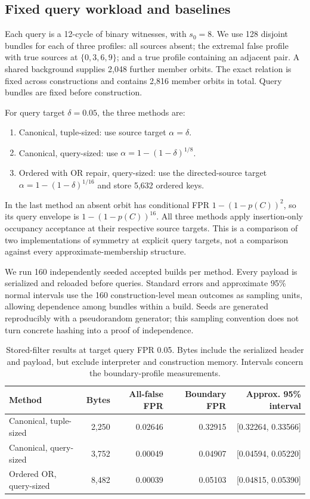 \documentclass[../main.tex]{subfiles}
\begin{document}
\subsection{Fixed query workload and baselines}
Each query is a 12-cycle of binary witnesses, with $s_0=8$. We use 128 disjoint
bundles for each of three profiles: all sources absent; the extremal false
profile with true sources at $\{0,3,6,9\}$; and a true profile containing an
adjacent pair. A shared background supplies 2,048 further member orbits.
The exact relation is fixed across constructions and contains 2,816 member
orbits in total. Query bundles are fixed before construction.

For query target $\delta=0.05$, the three methods are:
\begin{enumerate}
\item Canonical, tuple-sized: use source target $\alpha=\delta$.
\item Canonical, query-sized: use $\alpha=1-(1-\delta)^{1/8}$.
\item Ordered with OR repair, query-sized: use the directed-source target
$\alpha=1-(1-\delta)^{1/16}$ and store 5,632 ordered keys.
\end{enumerate}
In the last method an absent orbit has conditional FPR $1-(1-p(C))^2$,
so its query envelope is $1-(1-p(C))^{16}$. All three methods apply
insertion-only occupancy acceptance at their respective source targets.
This is a comparison of two implementations of symmetry at explicit query
targets, not a comparison against every approximate-membership structure.

We run 160 independently seeded accepted builds per method. Every payload
is serialized and reloaded before queries. Standard errors and approximate
95\% normal intervals use the 160 construction-level mean outcomes as sampling
units, allowing dependence among bundles within a build. Seeds are generated
reproducibly with a pseudorandom generator; this sampling convention does not
turn concrete hashing into a proof of independence.

\begin{table}[htbp]
\centering\small
\begin{tabular}{lrrrr}
\toprule
Method & Bytes & All-false FPR & Boundary FPR & Approx. 95\% interval\\
\midrule
Canonical, tuple-sized & 2,250 & 0.02646 & 0.32915 & [0.32264, 0.33566]\\
Canonical, query-sized & 3,752 & 0.00049 & 0.04907 & [0.04594, 0.05220]\\
Ordered OR, query-sized & 8,482 & 0.00039 & 0.05103 & [0.04815, 0.05390]\\
\bottomrule
\end{tabular}
\caption{Stored-filter results at target query FPR 0.05. Bytes include the
serialized header and payload, but exclude interpreter and construction memory.
Intervals concern the boundary-profile measurements.}
\label{tab:filter_calibration}
\end{table}
\end{document}
